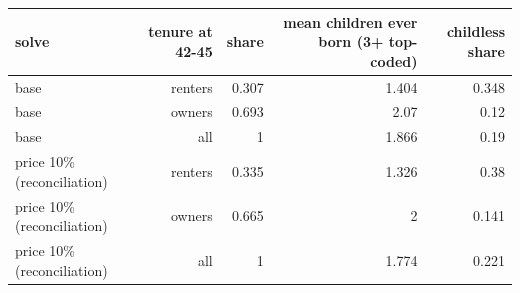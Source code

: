 \begin{tabular}{lrrrr}
\toprule
solve & tenure at 42-45 & share & mean children ever born (3+ top-coded) & childless share \\
\midrule
base & renters & 0.307 & 1.404 & 0.348 \\
base & owners & 0.693 & 2.07 & 0.12 \\
base & all & 1 & 1.866 & 0.19 \\
price 10\% (reconciliation) & renters & 0.335 & 1.326 & 0.38 \\
price 10\% (reconciliation) & owners & 0.665 & 2 & 0.141 \\
price 10\% (reconciliation) & all & 1 & 1.774 & 0.221 \\
\bottomrule
\end{tabular}
